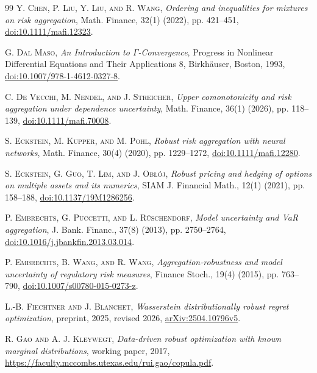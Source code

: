 \begin{thebibliography}{99}
\textsc{Y. Chen, P. Liu, Y. Liu, and R. Wang}, \emph{Ordering and inequalities for mixtures on risk aggregation}, Math. Finance, 32(1) (2022), pp. 421--451, \href{https://doi.org/10.1111/mafi.12323}{doi:10.1111/mafi.12323}.

\textsc{G. Dal Maso}, \emph{An Introduction to $\Gamma$-Convergence}, Progress in Nonlinear Differential Equations and Their Applications 8, Birkh\"auser, Boston, 1993, \href{https://doi.org/10.1007/978-1-4612-0327-8}{doi:10.1007/978-1-4612-0327-8}.

\textsc{C. De Vecchi, M. Nendel, and J. Streicher}, \emph{Upper comonotonicity and risk aggregation under dependence uncertainty}, Math. Finance, 36(1) (2026), pp. 118--139, \href{https://doi.org/10.1111/mafi.70008}{doi:10.1111/mafi.70008}.

\textsc{S. Eckstein, M. Kupper, and M. Pohl}, \emph{Robust risk aggregation with neural networks}, Math. Finance, 30(4) (2020), pp. 1229--1272, \href{https://doi.org/10.1111/mafi.12280}{doi:10.1111/mafi.12280}.

\textsc{S. Eckstein, G. Guo, T. Lim, and J. Obłój}, \emph{Robust pricing and hedging of options on multiple assets and its numerics}, SIAM J. Financial Math., 12(1) (2021), pp. 158--188, \href{https://doi.org/10.1137/19M1286256}{doi:10.1137/19M1286256}.

\textsc{P. Embrechts, G. Puccetti, and L. R\"uschendorf}, \emph{Model uncertainty and VaR aggregation}, J. Bank. Financ., 37(8) (2013), pp. 2750--2764, \href{https://doi.org/10.1016/j.jbankfin.2013.03.014}{doi:10.1016/j.jbankfin.2013.03.014}.

\textsc{P. Embrechts, B. Wang, and R. Wang}, \emph{Aggregation-robustness and model uncertainty of regulatory risk measures}, Finance Stoch., 19(4) (2015), pp. 763--790, \href{https://doi.org/10.1007/s00780-015-0273-z}{doi:10.1007/s00780-015-0273-z}.

\textsc{L.-B. Fiechtner and J. Blanchet}, \emph{Wasserstein distributionally robust regret optimization}, preprint, 2025, revised 2026, \href{https://arxiv.org/abs/2504.10796v5}{arXiv:2504.10796v5}.

\textsc{R. Gao and A. J. Kleywegt}, \emph{Data-driven robust optimization with known marginal distributions}, working paper, 2017, \url{https://faculty.mccombs.utexas.edu/rui.gao/copula.pdf}.


\end{thebibliography}
